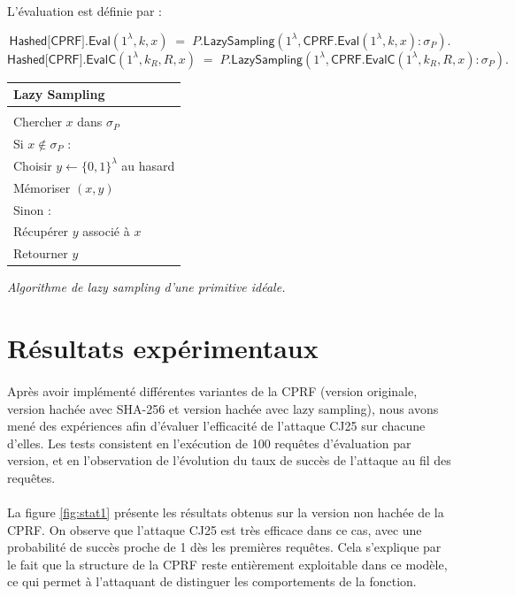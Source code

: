 \documentclass[9pt]{extarticle}
\begin{document}
L'évaluation est définie par :

\[
\textsf{Hashed[CPRF].Eval}(1^\lambda, k, x)
\;=\;
\textsf{$P$.LazySampling}(1^\lambda, \textsf{CPRF.Eval}(1^\lambda, k, x) : \sigma_P).
\]
\[
\textsf{Hashed[CPRF].EvalC}(1^\lambda, k_R, R, x)
\;=\;
\textsf{$P$.LazySampling}(1^\lambda, \textsf{CPRF.EvalC}(1^\lambda, k_R, R, x) : \sigma_P).
\]


\begin{center}
  \begin{tabular}{l}
    \textbf{Lazy Sampling} \\
    \hline \\
    Chercher $x$ dans $\sigma_P$ \\
    Si $x \notin \sigma_P$ : \\
    \quad Choisir $y \leftarrow \{0,1\}^\lambda$ au hasard \\
    \quad Mémoriser $(x,y)$ \\
    Sinon : \\
    \quad Récupérer $y$ associé à $x$ \\
    Retourner $y$
  \end{tabular}
  
  \vspace{1ex}
  \textit{Algorithme de lazy sampling d'une primitive idéale.}
\end{center}




\section{Résultats expérimentaux}

\paragraph{}Après avoir implémenté différentes variantes de la CPRF (version originale, version hachée avec SHA-256 et version hachée avec lazy sampling), 
nous avons mené des expériences afin d’évaluer l’efficacité de l’attaque CJ25 sur chacune d’elles. 
Les tests consistent en l’exécution de 100 requêtes d’évaluation par version, et en l’observation de l’évolution du taux de succès de l’attaque au fil des requêtes.

\paragraph{}La figure \ref{fig:stat1} présente les résultats obtenus sur la version non hachée de la CPRF. 
On observe que l’attaque CJ25 est très efficace dans ce cas, avec une probabilité de succès proche de 1 dès les premières requêtes. 
Cela s’explique par le fait que la structure de la CPRF reste entièrement exploitable dans ce modèle, ce qui permet à l’attaquant de distinguer les comportements de la fonction.
\end{document}
